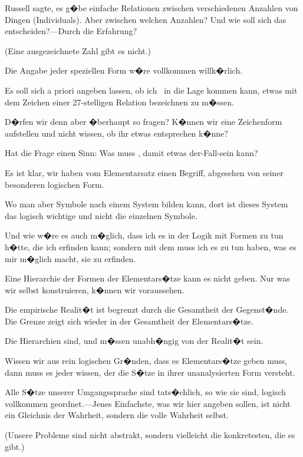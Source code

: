 {Russell sagte, es g�be einfache Relationen
zwischen verschiedenen Anzahlen von Dingen
(Individuals). Aber zwischen welchen Anzahlen?
Und wie soll sich das entscheiden?---Durch die
Erfahrung?

(Eine ausgezeichnete Zahl gibt es nicht.)}


{Die Angabe jeder speziellen Form w�re vollkommen
willk�rlich.}


{Es soll sich a priori angeben lassen, ob ich \zumBeispiel\ in
die Lage kommen kann, etwas mit dem
Zeichen einer 27-stelligen Relation bezeichnen zu
m�ssen.}


{D�rfen wir denn aber �berhaupt so fragen?
K�nnen wir eine Zeichenform aufstellen und nicht
wissen, ob ihr etwas entsprechen k�nne?

Hat die Frage einen Sinn: Was muss ,
damit etwas der-Fall-sein kann?}


{Es ist klar, wir haben vom Elementarsatz einen
Begriff, abgesehen von seiner besonderen logischen
Form.

Wo man aber Symbole nach einem System
bilden kann, dort ist dieses System das logisch
wichtige und nicht die einzelnen Symbole.

Und wie w�re es auch m�glich, dass ich es in
der Logik mit Formen zu tun h�tte, die ich erfinden
kann; sondern mit dem muss ich es zu tun haben,
was es mir m�glich macht, sie zu erfinden.}


{Eine Hierarchie der Formen der Elementars�tze
kann es nicht geben. Nur was wir selbst
konstruieren, k�nnen wir voraussehen.}


{Die empirische Realit�t ist begrenzt durch die
Gesamtheit der Gegenst�nde. Die Grenze zeigt
sich wieder in der Gesamtheit der Elementars�tze.

Die Hierarchien sind, und m�ssen unabh�ngig
von der Realit�t sein.}


{Wissen wir aus rein logischen Gr�nden, dass
es Elementars�tze geben muss, dann muss es jeder
wissen, der die S�tze in ihrer unanalysierten Form
versteht.}


{Alle S�tze unserer Umgangssprache sind tats�chlich,
so wie sie sind, logisch vollkommen geordnet.---Jenes
Einfachste, was wir hier angeben sollen,
ist nicht ein Gleichnis der Wahrheit, sondern die
volle Wahrheit selbst.

(Unsere Probleme sind nicht abstrakt, sondern
vielleicht die konkretesten, die es gibt.)}



